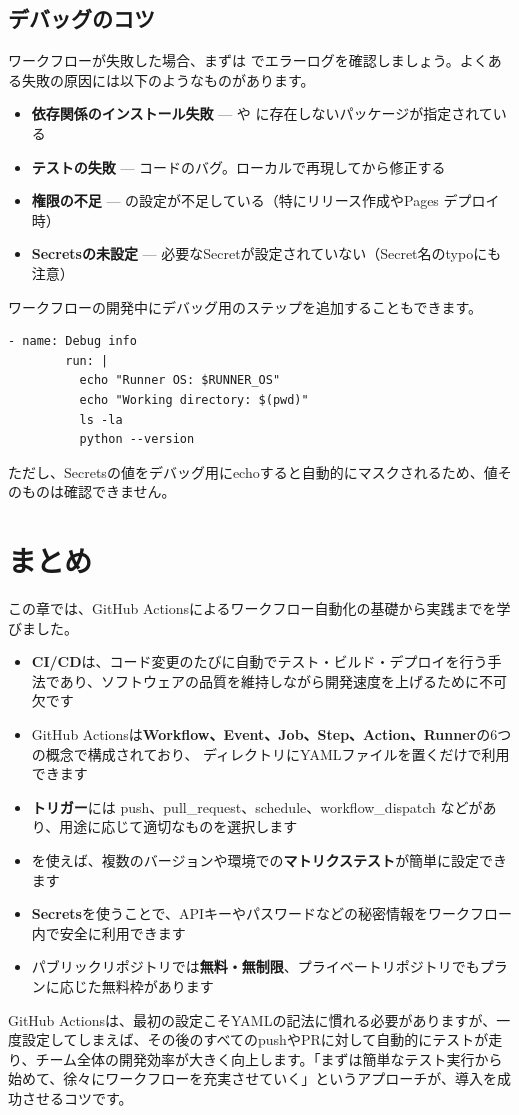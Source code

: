 \subsection{デバッグのコツ}

ワークフローが失敗した場合、まずは  でエラーログを確認しましょう。よくある失敗の原因には以下のようなものがあります。

\begin{itemize}
  \item \textbf{依存関係のインストール失敗} ---  や  に存在しないパッケージが指定されている
  \item \textbf{テストの失敗} --- コードのバグ。ローカルで再現してから修正する
  \item \textbf{権限の不足} ---  の設定が不足している（特にリリース作成やPages デプロイ時）
  \item \textbf{Secretsの未設定} --- 必要なSecretが設定されていない（Secret名のtypoにも注意）
\end{itemize}

ワークフローの開発中にデバッグ用のステップを追加することもできます。

\begin{lstlisting}[language={}]
      - name: Debug info
        run: |
          echo "Runner OS: $RUNNER_OS"
          echo "Working directory: $(pwd)"
          ls -la
          python --version
\end{lstlisting}

ただし、Secretsの値をデバッグ用にechoすると自動的にマスクされるため、値そのものは確認できません。

\section{まとめ}

この章では、GitHub Actionsによるワークフロー自動化の基礎から実践までを学びました。

\begin{itemize}
  \item \textbf{CI/CD}は、コード変更のたびに自動でテスト・ビルド・デプロイを行う手法であり、ソフトウェアの品質を維持しながら開発速度を上げるために不可欠です
  \item GitHub Actionsは\textbf{Workflow、Event、Job、Step、Action、Runner}の6つの概念で構成されており、 ディレクトリにYAMLファイルを置くだけで利用できます
  \item \textbf{トリガー}には push、pull\_request、schedule、workflow\_dispatch などがあり、用途に応じて適切なものを選択します
  \item {} を使えば、複数のバージョンや環境での\textbf{マトリクステスト}が簡単に設定できます
  \item \textbf{Secrets}を使うことで、APIキーやパスワードなどの秘密情報をワークフロー内で安全に利用できます
  \item パブリックリポジトリでは\textbf{無料・無制限}、プライベートリポジトリでもプランに応じた無料枠があります
\end{itemize}

GitHub Actionsは、最初の設定こそYAMLの記法に慣れる必要がありますが、一度設定してしまえば、その後のすべてのpushやPRに対して自動的にテストが走り、チーム全体の開発効率が大きく向上します。「まずは簡単なテスト実行から始めて、徐々にワークフローを充実させていく」というアプローチが、導入を成功させるコツです。
